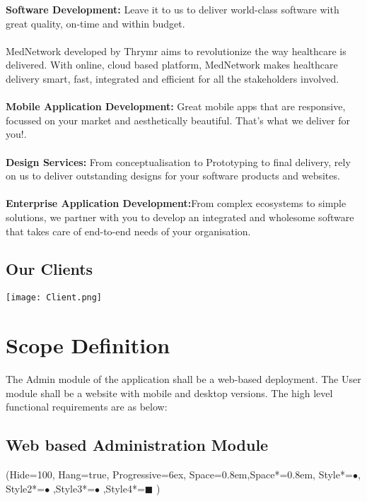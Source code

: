 \documentclass[a4paper]{article}
\begin{document}
	\textbf{Software Development:} {Leave it to us to deliver world-class software with great quality, on-time and within budget.\\ \\}
	{MedNetwork developed by Thrymr aims to revolutionize the way healthcare is delivered. With online, cloud based platform, MedNetwork makes healthcare delivery smart, fast, integrated and efficient for all the stakeholders involved.\\ \\}
	\textbf{Mobile Application Development:} {Great mobile apps that are responsive, focussed on your market and aesthetically beautiful. That's what we deliver for you!.\\ \\}
	\textbf{Design Services:} {From conceptualisation to Prototyping to final delivery, rely on us to deliver outstanding designs for your software products and websites.\\ \\}
	\textbf{Enterprise Application Development:}{From complex ecosystems to simple solutions, we partner with you to develop an integrated and wholesome software that takes care of end-to-end needs of your organisation.}
	
	\subsection{Our Clients}
	
	\bigskip
	\texttt{[image: Client.png]}\\[-1em]
		
	\newpage
	
	\section{Scope Definition}
	The Admin module of the application shall be a web-based deployment. The User module shall be a website with mobile and desktop versions. The high level functional requirements are as below:
	
	\subsection{Web based Administration Module}
			
	\ListProperties(Hide=100, Hang=true, Progressive=6ex, Space=0.8em,Space*=0.8em, Style*=$\bullet$, Style2*=$\bullet$ ,Style3*=$\bullet$ ,Style4*=\tiny$\blacksquare$ )
	
\end{document}
